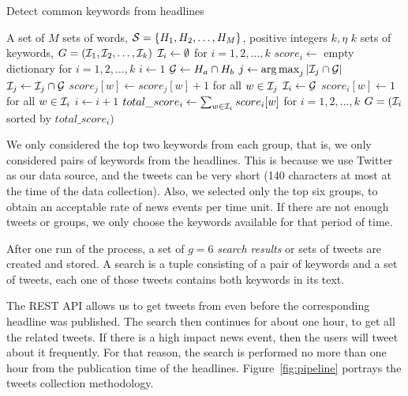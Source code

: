 \begin{algorithm}
\caption{Detect common keywords from headlines}
\label{alg:detect_keywords}
\begin{algorithmic}[1]
\REQUIRE A set of $M$ sets of words, $\mathcal{S}= \{H_1,H_2, \ldots, H_M\}$, positive integers $k, \eta$
\ENSURE $k$ sets of keywords, $G = (\mathcal{I}_1,\mathcal{I}_2,\ldots,\mathcal{I}_{k})$
\STATE $\mathcal{I}_i \leftarrow \emptyset$ for $i = 1,2, \ldots,k$ %
\STATE $score_i \leftarrow$ empty dictionary for $i = 1, 2, \ldots,k$ %
\STATE $i \leftarrow 1$
    \STATE $\mathcal{G} \leftarrow H_a \cap H_b$ \label{alg:line:intersect} %
    \STATE $j \leftarrow \operatorname{arg\,max}_j |\mathcal{I}_j \cap \mathcal{G}|$
        \STATE $\mathcal{I}_j \leftarrow \mathcal{I}_j \cap \mathcal{G}$
        \STATE $score_{j}[w] \leftarrow score_{j}[w] + 1$ for all $w \in \mathcal{I}_j$
    \ELSE
        \STATE $\mathcal{I}_i \leftarrow \mathcal{G}$
        \STATE $score_{i}[w] \leftarrow 1$ for all $w \in \mathcal{I}_i$
        \STATE $i \leftarrow i + 1$
    \ENDIF
\ENDFOR
\STATE $total\_score_i \leftarrow \sum_{w \in \mathcal{I}_i} score_{i}[w]$ for $i=1,2,\ldots,k$
\RETURN $G = (\mathcal{I}_i$ sorted by $total\_score_i)$

\end{algorithmic}
\end{algorithm}

We only considered the top two keywords from each group, that is, we only
considered pairs of keywords from the headlines. 
%
This is because we use Twitter as our data source, and the tweets can be very
short (140 characters at most at the time of the data collection). 
%
Also, we selected only the top six groups, to obtain an acceptable rate of news
events per time unit. 
%
If there are not enough tweets or groups, we only choose the keywords available
for that period of time.

After one run of the process, a set of $g=6$ \emph{search results} or sets of
tweets are created and stored. 
%
A search is a tuple consisting of a pair of keywords and a set of tweets, each
one of those tweets contains both keywords in its text.

The REST API allows us to get tweets from even before the corresponding headline
was published.
%
The search then continues for about one hour, to get all the related tweets. 
%
If there is a high impact news event, then the users will tweet about it
frequently. 
%
For that reason, the search is performed no more than one hour from the
publication time of the headlines. 
%
Figure~\ref{fig:pipeline} portrays the tweets collection methodology.



